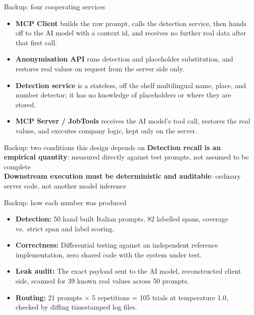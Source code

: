 \documentclass[aspectratio=169,11pt]{beamer}
\begin{document}
\begin{frame}{Backup: four cooperating services}
  \small
  \begin{itemize}
    \setlength{\itemsep}{0.25cm}
    \item \textbf{MCP Client} builds the raw prompt, calls the detection service, then hands off to the AI model with a context id, and receives no further real data after that first call.
    \item \textbf{Anonymisation API} runs detection and placeholder substitution, and restores real values on request from the server side only.
    \item \textbf{Detection service} is a stateless, off the shelf multilingual name, place, and number detector; it has no knowledge of placeholders or where they are stored.
    \item \textbf{MCP Server / JobTools} receives the AI model's tool call, restores the real values, and executes company logic, kept only on the server.
  \end{itemize}
\end{frame}

\begin{frame}{Backup: two conditions this design depends on}
  \centering
  \vspace{4mm}
  \textbf{Detection recall is an empirical quantity}: measured directly against test prompts, not assumed to be complete\\[4mm]
  \textbf{Downstream execution must be deterministic and auditable}: ordinary server code, not another model inference
\end{frame}

\begin{frame}{Backup: how each number was produced}
  \scriptsize
  \begin{itemize}
    \setlength{\itemsep}{0.2cm}
    \item \textbf{Detection:} 50 hand built Italian prompts, 82 labelled spans, coverage vs.\ strict span and label scoring.
    \item \textbf{Correctness:} Differential testing against an independent reference implementation, zero shared code with the system under test.
    \item \textbf{Leak audit:} The exact payload sent to the AI model, reconstructed client side, scanned for 39 known real values across 50 prompts.
    \item \textbf{Routing:} 21 prompts $\times$ 5 repetitions = 105 trials at temperature 1.0, checked by diffing timestamped log files.
  \end{itemize}
\end{frame}
\end{document}
